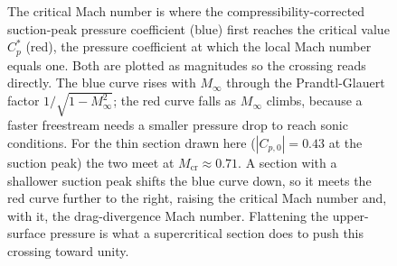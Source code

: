 \begin{figure}[htbp]
\centering
{}
\caption[Graphical construction of the critical Mach number]{The
critical Mach number is where the compressibility-corrected
suction-peak pressure coefficient (blue) first reaches the critical
value $C_p^{*}$ (red), the pressure coefficient at which the local Mach
number equals one. Both are plotted as magnitudes so the crossing reads
directly. The blue curve rises with $M_\infty$ through the
Prandtl-Glauert factor $1/\sqrt{1-M_\infty^2}$; the red curve falls as
$M_\infty$ climbs, because a faster freestream needs a smaller pressure
drop to reach sonic conditions. For the thin section drawn here
($|C_{p,0}|=0.43$ at the suction peak) the two meet at
$M_{\mathrm{cr}}\approx 0.71$. A section with a shallower suction peak
shifts the blue curve down, so it meets the red curve further to the
right, raising the critical Mach number and, with it, the
drag-divergence Mach number. Flattening the upper-surface pressure is
what a supercritical section does to push this crossing toward unity.}
\label{fig:vol03ch13:critical-mach}
\end{figure}
